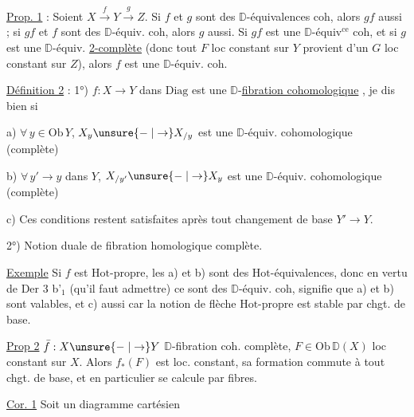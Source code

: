 
\uline{Prop. 1}  : Soient $X\xrightarrow{f}Y\xrightarrow{g}Z$. Si $f$ et $g$ sont des $\mathbb D$-équivalences coh, alors $gf$ aussi ; si $gf$ et $f$ sont des $\mathbb D$-équiv. coh, alors $g$ aussi. Si $gf$ est une $\mathbb D$-équiv$^{\mathrm{ce}}$ coh, et si $g$ est une $\mathbb D$-équiv. \uline{2-complète} (donc tout $F$ loc constant sur $Y$ provient d'un $G$ loc constant sur $Z$), alors $f$ est une $\mathbb D$-équiv. coh.

\uline{Définition 2} : 1°) $f:X\to Y$ dans $\mathrm{Diag}$ est  une $\mathbb D$-\uline{fibration cohomologique} , je dis bien  si

a) $\forall\,y\in\mathrm{Ob}\,Y$, $X_y\unsure{\relbar|\to}X_{/y}$ est une $\mathbb D$-équiv.  cohomologique (complète)

b) $\forall\,y'\to y$ dans $Y$, $X_{/y'}\unsure{\relbar|\to}X_y$ est une $\mathbb D$-équiv.  cohomologique (complète)


c) Ces conditions restent satisfaites après tout changement de base $Y'\to Y$.

2°) Notion duale de fibration homologique complète.

\uline{Exemple} Si $f$ est $\mathrm{Hot}$-propre, les  a) et b) sont des $\mathrm{Hot}$-équivalences, donc en vertu de Der 3 b'$_1$ (qu'il faut admettre) ce sont des $\mathbb D$-équiv. coh,  signifie que a) et b) sont valables, et c) aussi car la notion de flèche $\mathrm{Hot}$-propre est stable par chgt. de base.

\uline{Prop 2}  $\bar f:X\unsure{\relbar|\to}Y$ $\mathbb D$-fibration coh. complète, $F\in\mathrm{Ob}\,\mathbb D(X)$ loc constant sur $X$. Alors $f_*(F)$ est loc. constant, sa formation commute à tout chgt. de base, et en particulier se calcule  par fibres.


\uline{Cor. 1} Soit  un diagramme cartésien

